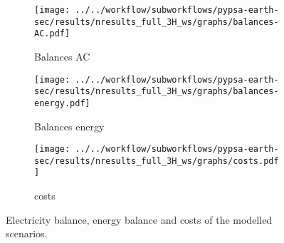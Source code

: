 \begin{figure}[h!]
    \centering
    \begin{subfigure}[b]{\linewidth}
        \centering
        \texttt{[image: ../../workflow/subworkflows/pypsa-earth-sec/results/nresults\_full\_3H\_ws/graphs/balances-AC.pdf]}
        \caption{Balances AC}
        \label{fig:balances_AC}
    \end{subfigure}
    
    \vspace{0.5cm} %
    
    \begin{subfigure}[b]{\linewidth}
        \centering
        \texttt{[image: ../../workflow/subworkflows/pypsa-earth-sec/results/nresults\_full\_3H\_ws/graphs/balances-energy.pdf]}
        \caption{Balances energy}
        \label{fig:balances_energy}
    \end{subfigure}

    \vspace{0.5cm} %
    
    \begin{subfigure}[b]{\linewidth}
        \centering
        \texttt{[image: ../../workflow/subworkflows/pypsa-earth-sec/results/nresults\_full\_3H\_ws/graphs/costs.pdf]}
        \caption{costs}
        \label{fig:balances_costs}
    \end{subfigure}
    
    \caption{Electricity balance, energy balance and costs of the modelled scenarios.}
    \label{fig:barplots}
\end{figure}







